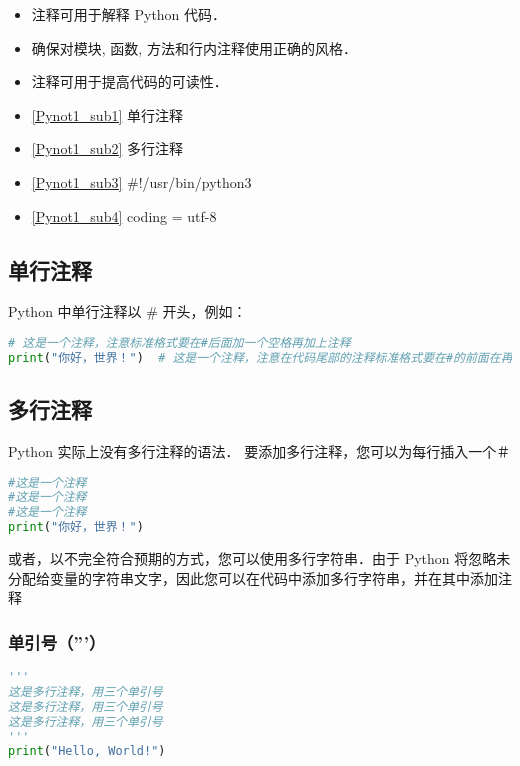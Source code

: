 
\begin{itemize}
\item 注释可用于解释 Python 代码．
\item 确保对模块, 函数, 方法和行内注释使用正确的风格．
\item 注释可用于提高代码的可读性．
\end{itemize}

\begin{itemize}
\item \autoref{Pynot1_sub1} 单行注释
\item \autoref{Pynot1_sub2} 多行注释
\item \autoref{Pynot1_sub3} #!/usr/bin/python3
\item \autoref{Pynot1_sub4} coding = utf-8
\end{itemize}

\subsection{单行注释}\label{Pynot1_sub1}
Python 中单行注释以 # 开头，例如：
\begin{lstlisting}[language=python]
# 这是一个注释，注意标准格式要在#后面加一个空格再加上注释
print("你好，世界！")  # 这是一个注释，注意在代码尾部的注释标准格式要在#的前面在再加两个空格
\end{lstlisting}

\subsection{多行注释}\label{Pynot1_sub2}
Python 实际上没有多行注释的语法．
要添加多行注释，您可以为每行插入一个＃
\begin{lstlisting}[language=python]
#这是一个注释
#这是一个注释
#这是一个注释
print("你好，世界！")
\end{lstlisting}

或者，以不完全符合预期的方式，您可以使用多行字符串．由于 Python 将忽略未分配给变量的字符串文字，因此您可以在代码中添加多行字符串，并在其中添加注释
\subsubsection{单引号（'''）}
\begin{lstlisting}[language=python]
'''
这是多行注释，用三个单引号
这是多行注释，用三个单引号 
这是多行注释，用三个单引号
'''
print("Hello, World!")
\end{lstlisting}

